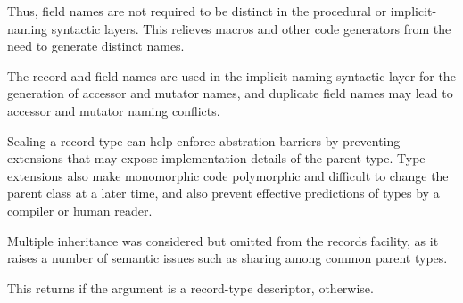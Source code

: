 \begin{entry}{%
}
\begin{rationale}
  Thus, field names are not required to be distinct in the procedural or
  implicit-naming syntactic layers.
  This relieves macros and other code generators from the need to
  generate distinct names.

  The record and field names are used in the implicit-naming syntactic
  layer for the generation of accessor and mutator names, and duplicate
  field names may lead to accessor and mutator naming conflicts.
\end{rationale}

\begin{rationale}
  Sealing a record type can help enforce abstration barriers by preventing
  extensions that may expose implementation details of the parent type.
  Type extensions also make monomorphic code polymorphic and
  difficult to change the parent class at a later time, and also
  prevent effective predictions of types by a compiler or human
  reader.
\end{rationale}

\begin{rationale}
  Multiple inheritance was considered but omitted from the records
  facility, as it raises a number of semantic issues such as
  sharing among common parent types.
\end{rationale}
\end{entry}

\begin{entry}{%
}
   
This returns \schtrue{} if the argument is a record-type descriptor,
\schfalse{} otherwise.
\end{entry}

